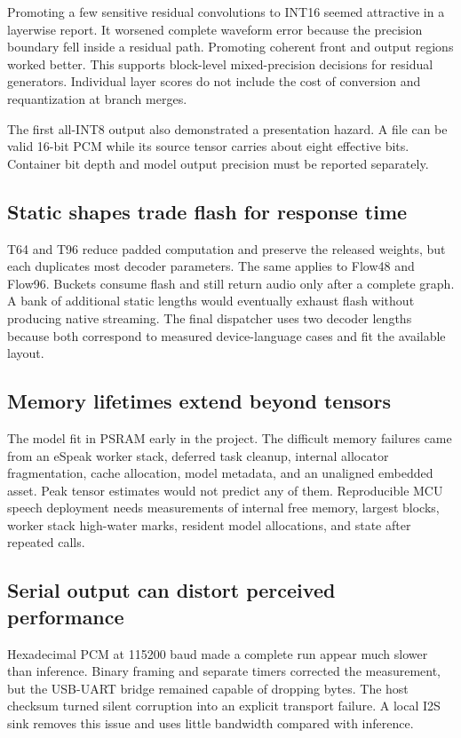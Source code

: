 \documentclass[10pt]{article}
\begin{document}
Promoting a few sensitive residual convolutions to INT16 seemed attractive in
a layerwise report. It worsened complete waveform error because the precision
boundary fell inside a residual path. Promoting coherent front and output
regions worked better. This supports block-level mixed-precision decisions
for residual generators. Individual layer scores do not include the cost of
conversion and requantization at branch merges.

The first all-INT8 output also demonstrated a presentation hazard. A file can
be valid 16-bit PCM while its source tensor carries about eight effective
bits. Container bit depth and model output precision must be reported
separately.

\subsection{Static shapes trade flash for response time}

T64 and T96 reduce padded computation and preserve the released weights, but
each duplicates most decoder parameters. The same applies to Flow48 and
Flow96. Buckets consume flash and still return audio only after a complete
graph. A bank of additional static lengths would eventually exhaust flash
without producing native streaming. The final dispatcher uses two decoder
lengths because both correspond to measured device-language cases and fit the
available layout.

\subsection{Memory lifetimes extend beyond tensors}

The model fit in PSRAM early in the project. The difficult memory failures
came from an eSpeak worker stack, deferred task cleanup, internal allocator
fragmentation, cache allocation, model metadata, and an unaligned embedded
asset. Peak tensor estimates would not predict any of them. Reproducible MCU
speech deployment needs measurements of internal free memory, largest blocks,
worker stack high-water marks, resident model allocations, and state after
repeated calls.

\subsection{Serial output can distort perceived performance}

Hexadecimal PCM at 115200 baud made a complete run appear much slower than
inference. Binary framing and separate timers corrected the measurement, but
the USB-UART bridge remained capable of dropping bytes. The host checksum
turned silent corruption into an explicit transport failure. A local I2S sink
removes this issue and uses little bandwidth compared with inference.
\end{document}
